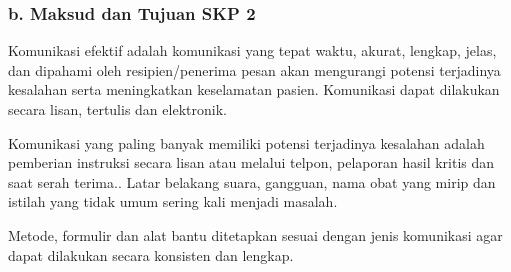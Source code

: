 \documentclass[
]{book}
\begin{document}
\hypertarget{b.-maksud-dan-tujuan-skp-2}{%
\subsubsection*{b. Maksud dan Tujuan SKP 2}\label{b.-maksud-dan-tujuan-skp-2}}

Komunikasi efektif adalah komunikasi yang tepat waktu, akurat, lengkap, jelas, dan dipahami oleh resipien/penerima pesan akan mengurangi potensi terjadinya kesalahan serta meningkatkan keselamatan pasien. Komunikasi dapat dilakukan secara lisan, tertulis dan elektronik.

Komunikasi yang paling banyak memiliki potensi terjadinya kesalahan adalah pemberian instruksi secara lisan atau melalui telpon, pelaporan hasil kritis dan saat serah terima.. Latar belakang suara, gangguan, nama obat yang mirip dan istilah yang tidak umum sering kali menjadi masalah.

Metode, formulir dan alat bantu ditetapkan sesuai dengan jenis komunikasi agar dapat dilakukan secara konsisten dan lengkap.
\end{document}
